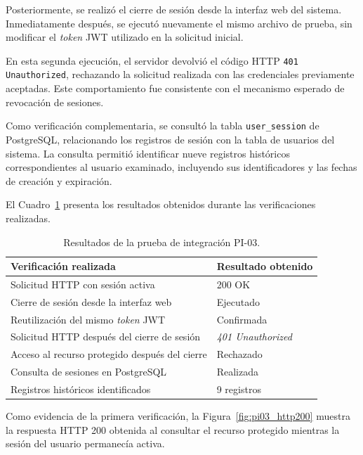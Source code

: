 Posteriormente, se realizó el cierre de sesión desde la interfaz web del sistema. Inmediatamente después, se ejecutó nuevamente el mismo archivo de prueba, sin modificar el \textit{token} JWT utilizado en la solicitud inicial.

En esta segunda ejecución, el servidor devolvió el código HTTP \texttt{401 Unauthorized}, rechazando la solicitud realizada con las credenciales previamente aceptadas. Este comportamiento fue consistente con el mecanismo esperado de revocación de sesiones.

Como verificación complementaria, se consultó la tabla \texttt{user\_session} de PostgreSQL, relacionando los registros de sesión con la tabla de usuarios del sistema. La consulta permitió identificar nueve registros históricos correspondientes al usuario examinado, incluyendo sus identificadores y las fechas de creación y expiración.

El Cuadro~\ref{tab:pi03_resultados} presenta los resultados obtenidos durante las verificaciones realizadas.

\begin{table}[htbp]
    \centering
    \caption{Resultados de la prueba de integración PI-03.}
    \label{tab:pi03_resultados}
    \small
    \begin{tabular}{|p{}|p{}|}
        \hline
        \textbf{Verificación realizada} & \textbf{Resultado obtenido} \\
        \hline
        Solicitud HTTP con sesión activa & 200 OK \\
        \hline
        Cierre de sesión desde la interfaz web & Ejecutado \\
        \hline
        Reutilización del mismo \textit{token} JWT & Confirmada \\
        \hline
        Solicitud HTTP después del cierre de sesión & \textit{401 Unauthorized} \\
        \hline
        Acceso al recurso protegido después del cierre & Rechazado \\
        \hline
        Consulta de sesiones en PostgreSQL & Realizada \\
        \hline
        Registros históricos identificados & 9 registros \\
        \hline
    \end{tabular}
\end{table}

Como evidencia de la primera verificación, la Figura~\ref{fig:pi03_http200} muestra la respuesta HTTP 200 obtenida al consultar el recurso protegido mientras la sesión del usuario permanecía activa.


